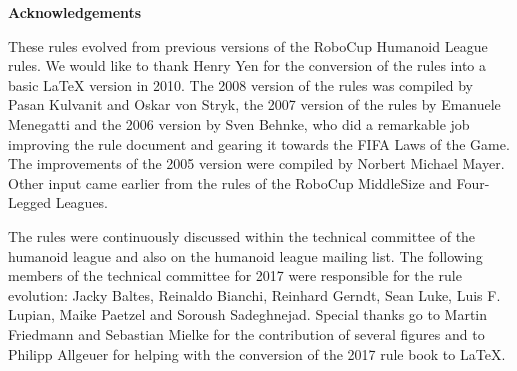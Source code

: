 \bigskip

{\bfseries Acknowledgements}

\headlinebox

These rules evolved from previous versions of the RoboCup Humanoid League rules. We would like to thank Henry Yen for the conversion of the rules into a basic LaTeX version in 2010. The 2008 version of the rules was compiled by Pasan Kulvanit and Oskar von Stryk, the 2007 version of the rules by Emanuele Menegatti and the 2006 version by Sven Behnke, who did a remarkable job improving the rule document and gearing it towards the FIFA Laws of the Game. The improvements of the 2005 version were compiled by Norbert Michael Mayer. Other input came earlier from the rules of the RoboCup MiddleSize and Four-Legged Leagues.

The rules were continuously discussed within the technical committee of the humanoid league and also on the humanoid league mailing list. The following members of the technical committee for 2017 were responsible for the rule evolution: Jacky Baltes, Reinaldo Bianchi, Reinhard Gerndt, Sean Luke, Luis F. Lupian, Maike Paetzel and Soroush Sadeghnejad. Special thanks go to Martin Friedmann and Sebastian Mielke for the contribution of several figures and to Philipp Allgeuer for helping with the conversion of the 2017 rule book to LaTeX.
